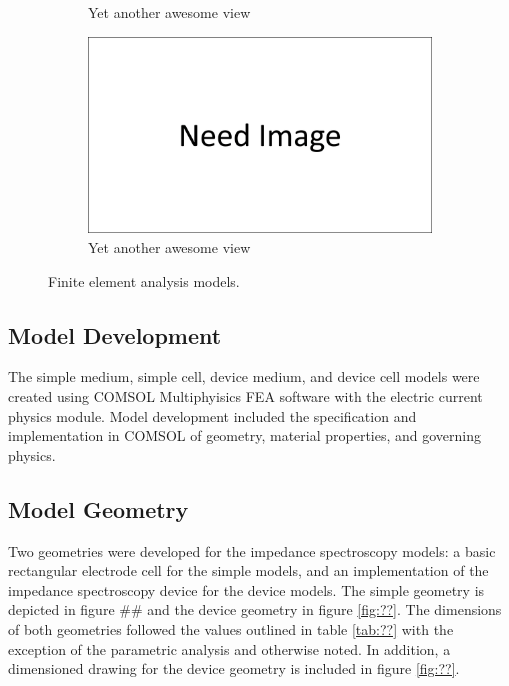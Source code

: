 \begin{figure}
\begin{subfigure}[b]{0.45\textwidth}
        \caption{Yet another awesome view}
        \label{fig:device_medium_fea_model}
    \end{subfigure}
    \hfill
    \begin{subfigure}[b]{0.45\textwidth}
        \centering
        \includegraphics[width=\textwidth]{images/need_image.png}
        \caption{Yet another awesome view}
        \label{fig:device_cell_fea_model}
    \end{subfigure}
    \caption{Finite element analysis models.}
    \label{fig:FEA_models}
\end{figure}


\subsection{Model Development}
\par The simple medium, simple cell, device medium, and device cell models were created using COMSOL Multiphyisics FEA software with the electric current physics module. Model development included the specification and implementation in COMSOL of geometry, material properties, and governing physics.

\subsection*{Model Geometry}
\par Two geometries were developed for the impedance spectroscopy models: a basic rectangular electrode cell for the simple models, and an implementation of the impedance spectroscopy device for the device models. The simple geometry is depicted in figure ## and the device geometry in figure \ref{fig:??}. The dimensions of both geometries followed the values outlined in table \ref{tab:??} with the exception of the parametric analysis and otherwise noted. In addition, a dimensioned drawing for the device geometry is included in figure \ref{fig:??}.

